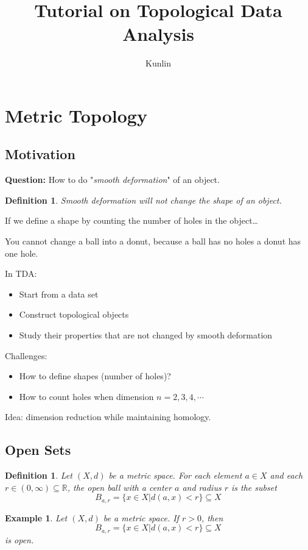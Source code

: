 \documentclass[12pt,a4paper]{article}
\theoremstyle{plain}
\newtheorem{example}[theorem]{Example}
\newtheorem{definition}[theorem]{Definition}
\begin{document}
\title{Tutorial on Topological Data Analysis}
\author{Kunlin}
\maketitle

\section{Metric Topology}

\subsection{Motivation}

\textbf{Question: } How to do "\emph{smooth deformation}" of an object. 

\begin{definition}
    Smooth deformation will not change the shape of an object. 
\end{definition}
If we define a shape by counting the number of holes in the object\dots

You cannot change a ball into a donut, because a ball has no holes a donut has one hole. 

In TDA:
\begin{itemize}
    \item Start from a data set
    \item Construct topological objects
    \item Study their properties that are not changed by smooth deformation
\end{itemize}

Challenges: 
\begin{itemize}
    \item How to define shapes (number of holes)?
    \item How to count holes when dimension $n=2,3,4,\cdots$
\end{itemize}

Idea: dimension reduction while maintaining homology. 

\subsection{Open Sets}

\begin{definition}
    Let $(X,d)$ be a metric space. For each element $a \in X$ and each $r\in (0, \infty) \subseteq \mathbb{R}$, the \emph{open ball with a center $a$ and radius $r$} is the subset 
    \begin{equation}
        B_{a,r}=\{x\in X | d(a,x) < r\} \subseteq X
    \end{equation}
\end{definition}

\begin{example}
    Let $(X,d)$ be a metric space. If $r>0$, then 
\begin{equation}
    B_{a,r}=\{x\in X | d(a,x) < r\} \subseteq X
\end{equation}
is open. 
\end{example}
    
\end{document}
